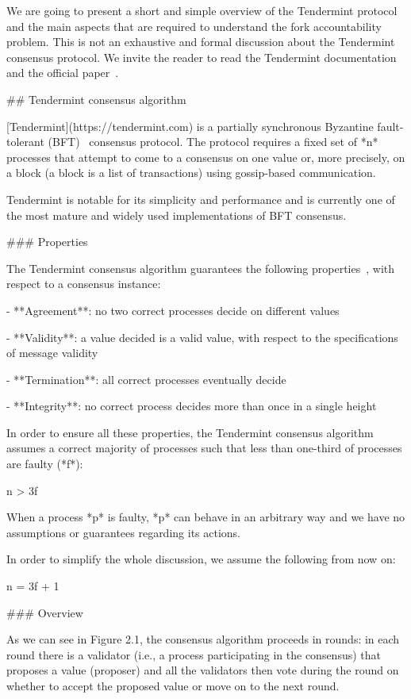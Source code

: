 \documentclass[a4paper,11pt,oneside]{report}
\begin{document}
\begin{markdown}

We are going to present a short and simple overview of the Tendermint protocol and the main aspects that are required to understand the fork accountability problem.
This is not an exhaustive and formal discussion about the Tendermint consensus protocol. We invite the reader to read the Tendermint documentation~\cite{tendermint-doc} and the official paper~\cite{buchman2018latest}.

## Tendermint consensus algorithm

[Tendermint](https://tendermint.com) is a partially synchronous Byzantine fault-tolerant (BFT)~\cite{wiki:bft} consensus protocol. The protocol requires a fixed set of *n* processes that attempt to come to a consensus on one value or, more precisely, on a block (a block is a list of transactions) using gossip-based communication. 

Tendermint is notable for its simplicity and performance and is currently one of the most mature and widely used implementations of BFT consensus.

### Properties 

The Tendermint consensus algorithm guarantees the following properties~\cite{buchman2018latest}, with respect to a consensus instance:

- **Agreement**: no two correct processes decide on different values

- **Validity**: a value decided is a valid value, with respect to the specifications of message validity

- **Termination**: all correct processes eventually decide

- **Integrity**: no correct process decides more than once in a single height 

In order to ensure all these properties, the Tendermint consensus algorithm assumes a correct majority of processes such that less than one-third of processes are faulty (*f*):
 
    n > 3f
 
When a process *p* is faulty, *p* can behave in an arbitrary way and we have no assumptions or guarantees regarding its actions.
 
In order to simplify the whole discussion, we assume the following from now on:
 
    n = 3f + 1

### Overview

As we can see in Figure 2.1, the consensus algorithm proceeds in rounds: in each round there is a validator (i.e., a process participating in the consensus) that proposes a value (proposer) and all the validators then vote during the round on whether to accept the proposed value or move on to the next round.


\end{markdown}
\end{document}
